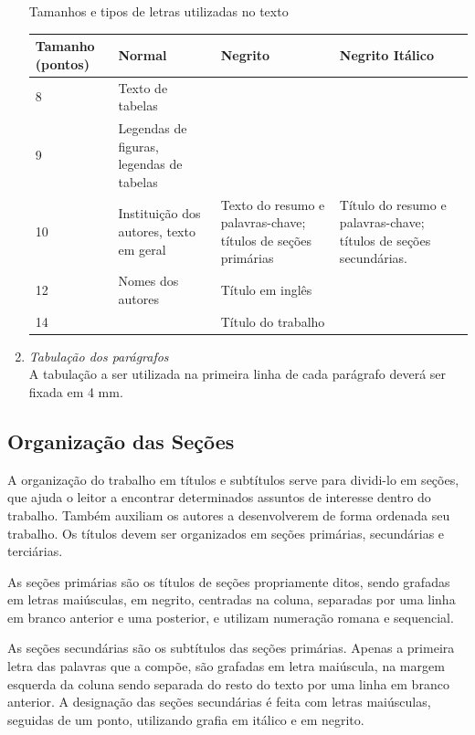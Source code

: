 \documentclass{ceel}
\begin{document}
\begin{multicols}{2}
\begin{enumerate}[1)]
\begin{minipage}[h]{\columnwidth}
\begin{scriptsize}
\captionsetup{type=table}
\caption{Tamanhos e tipos de letras utilizadas no texto}
\begin{tabular}{p{1cm}p{1.8cm}p{1.8cm}p{1.8cm}}\hline
\textbf{Tamanho (pontos)}&	\textbf{Normal}&\textbf{Negrito} & \textbf{Negrito Itálico} \\\hline
8 & Texto de tabelas &  &  \\ \hline
9 & Legendas de figuras, legendas de tabelas & & \\\hline
10 & Instituição dos autores, texto em geral & Texto do resumo e palavras-chave; títulos de seções primárias &  Título do resumo e palavras-chave; títulos de seções secundárias.\\\hline
12 & Nomes dos autores & Título em inglês &  \\\hline
14 &  & Título do trabalho &  \\\hline
\end{tabular}
\end{scriptsize}
\end{minipage}
\item \emph{Tabulação dos parágrafos}\\
A tabulação a ser utilizada na primeira linha de cada parágrafo deverá ser fixada em 4 mm.
\end{enumerate}

\subsection{Organização das Seções}
A organização do trabalho em títulos e subtítulos serve para dividi-lo em seções, que ajuda o leitor a encontrar determinados assuntos de interesse dentro do trabalho. Também auxiliam os autores a desenvolverem de forma ordenada seu trabalho. Os títulos devem ser organizados em seções primárias, secundárias e terciárias.

As seções primárias são os títulos de seções propriamente ditos, sendo grafadas em letras maiúsculas, em negrito, centradas na coluna, separadas por uma linha em branco anterior e uma posterior, e utilizam numeração romana e sequencial.

As seções secundárias são os subtítulos das seções primárias. Apenas a primeira letra das palavras que a compõe, são grafadas em letra maiúscula, na margem esquerda da coluna sendo separada do resto do texto por uma linha em branco anterior. A designação das seções secundárias é feita com letras maiúsculas, seguidas de um ponto, utilizando grafia em itálico e em negrito.


\end{multicols}
\end{document}
